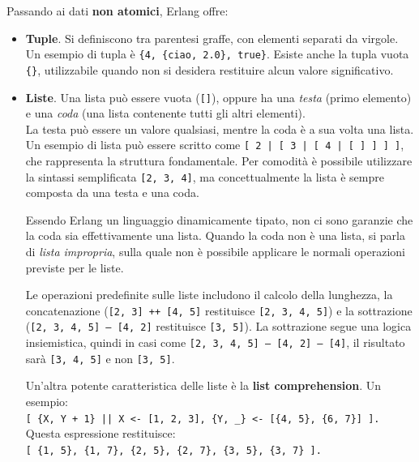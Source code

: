\documentclass{article}
\begin{document}
Passando ai dati \textbf{non atomici}, Erlang offre:
\begin{itemize}
    \item \textbf{Tuple}. Si definiscono tra parentesi graffe, con elementi separati da virgole. Un esempio di tupla è \texttt{\{4, \{ciao, 2.0\}, true\}}. Esiste anche la tupla vuota \texttt{\{\}}, utilizzabile quando non si desidera restituire alcun valore significativo.
    \item \textbf{Liste}. Una lista può essere vuota (\texttt{[]}), oppure ha una \textit{testa} (primo elemento) e una \textit{coda} (una lista contenente tutti gli altri elementi).\\
    La testa può essere un valore qualsiasi, mentre la coda è a sua volta una lista.\\
    Un esempio di lista può essere scritto come \texttt{[ 2 | [ 3 | [ 4 | [ ] ] ] ]}, che rappresenta la struttura fondamentale. Per comodità è possibile utilizzare la sintassi semplificata \texttt{[2, 3, 4]}, ma concettualmente la lista è sempre composta da una testa e una coda.
    
    Essendo Erlang un linguaggio dinamicamente tipato, non ci sono garanzie che la coda sia effettivamente una lista. Quando la coda non è una lista, si parla di \textit{lista impropria}, sulla quale non è possibile applicare le normali operazioni previste per le liste.
    
    Le operazioni predefinite sulle liste includono il calcolo della lunghezza, la concatenazione (\texttt{[2, 3] ++ [4, 5]} restituisce \texttt{[2, 3, 4, 5]}) e la sottrazione (\texttt{[2, 3, 4, 5] -- [4, 2]} restituisce \texttt{[3, 5]}). La sottrazione segue una logica insiemistica, quindi in casi come \texttt{[2, 3, 4, 5] -- [4, 2] -- [4]}, il risultato sarà \texttt{[3, 4, 5]} e non \texttt{[3, 5]}.

    Un'altra potente caratteristica delle liste è la \textbf{list comprehension}. Un esempio: \\
    \texttt{[ \{X, Y + 1\} || X <- [1, 2, 3], \{Y, \_\} <- [\{4, 5\}, \{6, 7\}] ].}\\
    Questa espressione restituisce:\\
    \texttt{[ \{1, 5\}, \{1, 7\}, \{2, 5\}, \{2, 7\}, \{3, 5\}, \{3, 7\} ].}
    

\end{itemize}
\end{document}
